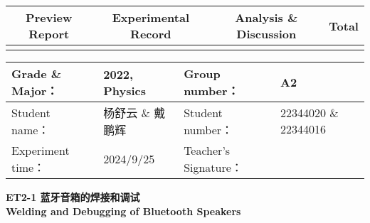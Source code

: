 


\begin{table}
	\renewcommand\arraystretch{1.7}
	\begin{tabularx}{\textwidth}{
			|X|X|X|X
			|X|X|X|X|}
		\hline
		\multicolumn{2}{|c|}{Preview Report}&\multicolumn{2}{|c|}{Experimental Record}&\multicolumn{2}{|c|}{Analysis \& Discussion}&\multicolumn{2}{|c|}{\Large\textbf{Total}}\\
		\hline
		\LARGE & & \LARGE & & \LARGE & & \LARGE & \\
		\hline
	\end{tabularx}
\end{table}


\begin{table}
	\renewcommand\arraystretch{1.7}
	\begin{tabularx}{\textwidth}{|X|X|X|X|}
		\hline
		Grade \& Major： & 2022, Physics &Group number： & A2\\
		\hline
		Student name： & 杨舒云 \& 戴鹏辉  & Student number： & 22344020 \& 22344016\\
		\hline
		Experiment time： & 2024/9/25 & Teacher's Signature： & \\
		\hline
	\end{tabularx}
\end{table}


\begin{center}
	\huge \textbf{ET2-1 \quad 蓝牙音箱的焊接和调试\\Welding and Debugging of Bluetooth Speakers}
\end{center}


